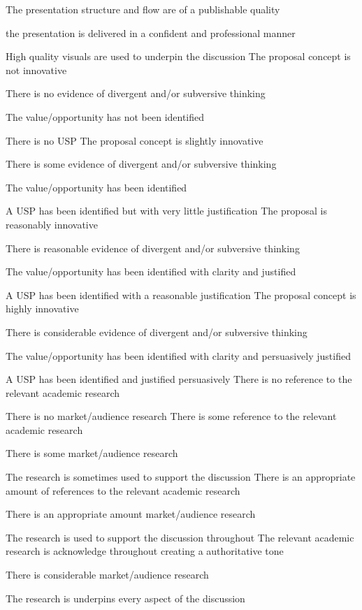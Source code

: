 \begin{markingrubric}
            \par 	The presentation structure and flow are of a publishable quality
            \par    the presentation is delivered in a confident and professional manner   
            \par    High quality visuals are used to underpin the discussion
        \grade\fail 	The proposal concept is not innovative
            \par		There is no evidence of divergent and/or subversive thinking 
            \par        The value/opportunity has not been identified 
            \par        There is no USP
        \grade   	The proposal concept is slightly innovative
            \par	There is some evidence of divergent and/or subversive thinking 
            \par    The value/opportunity has been identified 
            \par    A USP has been identified but with very little justification
        \grade   	The proposal is reasonably innovative
            \par	There is reasonable evidence of divergent and/or subversive thinking 
            \par    The value/opportunity has been identified with clarity and justified
            \par    A USP has been identified with a reasonable justification
        \grade   	The proposal concept is highly innovative
            \par	There is considerable evidence of divergent and/or subversive thinking 
            \par    The value/opportunity has been identified with clarity and persuasively justified  
            \par    A USP has been identified and justified persuasively
        \grade\fail 	There is no reference to the relevant academic research
            \par 		There is no market/audience research
        \grade 		There is some reference to the relevant academic research
            \par 		There is some market/audience research
            \par        The research is sometimes used to support the discussion
        \grade 		There is an appropriate amount of references to the relevant academic research
            \par 		There is an appropriate amount market/audience research
            \par        The research is used to support the discussion throughout
        \grade 		The relevant academic research is acknowledge throughout creating a authoritative tone 
            \par 		There is considerable market/audience research
            \par        The research is underpins every aspect of the discussion


\end{markingrubric}
